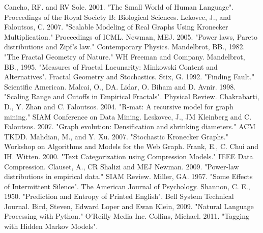 \documentclass[12pt]{article}
\begin{document}

\begin{thebibliography}{99}
    Cancho, RF. and RV Sole. 2001. "The Small World of Human Language". Proceedings of the Royal Society B: Biological Sciences.
    Lekovec, J., and Faloutsos, C. 2007. "Scalable Modeling of Real Graphs Using Kronecker Multiplication." Proceedings of ICML.
    Newman, MEJ. 2005. "Power laws, Pareto distributions and Zipf's law." Contemporary Physics.
    Mandelbrot, BB., 1982. "The Fractal Geometry of Nature." WH Freeman and Company.
    Mandelbrot, BB., 1995. "Measures of Fractal Lacunarity: Minkowski Content and Alternatives". Fractal Geometry and Stochastics.
    Stix, G. 1992. "Finding Fault." Scientific American.
    Malcai, O., DA. Lidar, O. Biham and D. Avnir. 1998. "Scaling Range and Cutoffs in Empirical Fractals". Physical Review.
    Chakrabarti, D., Y. Zhan and C. Faloutsos. 2004. "R-mat: A recursive model for graph mining." SIAM Conference on Data Mining.
    Leskovec, J., JM Kleinberg and C. Faloutsos. 2007. "Graph evolution: Densification and shrinking diameters." ACM TKDD.
    Mahdian, M., and Y. Xu. 2007. "Stochastic Kronecker Graphs." Workshop on Algorithms and Models for the Web Graph.
    Frank, E., C. Chui and IH. Witten. 2000. "Text Categorization using Compression Models." IEEE Data Compression.
    Clauset, A., CR Shalizi and MEJ Newman. 2009. "Power-law distributions in empirical data." SIAM Review.
    Miller, GA. 1957. "Some Effects of Intermittent Silence". The American Journal of Psychology.
    Shannon, C. E., 1950. "Prediction and Entropy of Printed English". Bell System Technical Journal.
    Bird, Steven, Edward Loper and Ewan Klein, 2009. "Natural Language Processing with Python." O'Reilly Media Inc.
    Collins, Michael. 2011. "Tagging with Hidden Markov Models".
\end{thebibliography}
\end{document}
